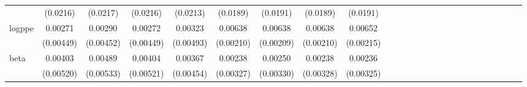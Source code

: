 \begin{table}[htbp]
\begin{tabular}{l*{24}{c}}
                    &    (0.0216)         &    (0.0217)         &    (0.0216)         &    (0.0213)         &    (0.0189)         &    (0.0191)         &    (0.0189)         &    (0.0191)         &                     &                     &                     &                     &                     &                     &                     &                     &                     &                     &                     &                     &                     &                     &                     &                     \\
[1em]
logppe              &     0.00271         &     0.00290         &     0.00272         &     0.00323         &     0.00638\sym{***}&     0.00638\sym{***}&     0.00638\sym{***}&     0.00652\sym{***}&                     &                     &                     &                     &                     &                     &                     &                     &                     &                     &                     &                     &                     &                     &                     &                     \\
                    &   (0.00449)         &   (0.00452)         &   (0.00449)         &   (0.00493)         &   (0.00210)         &   (0.00209)         &   (0.00210)         &   (0.00215)         &                     &                     &                     &                     &                     &                     &                     &                     &                     &                     &                     &                     &                     &                     &                     &                     \\
[1em]
beta                &     0.00403         &     0.00489         &     0.00404         &     0.00367         &     0.00238         &     0.00250         &     0.00238         &     0.00236         &                     &                     &                     &                     &                     &                     &                     &                     &                     &                     &                     &                     &                     &                     &                     &                     \\
                    &   (0.00520)         &   (0.00533)         &   (0.00521)         &   (0.00454)         &   (0.00327)         &   (0.00330)         &   (0.00328)         &   (0.00325)         &                     &                     &                     &                     &                     &                     &                     &                     &                     &                     &                     &                     &                     &                     &                     &                     \\

\end{tabular}
\end{table}
